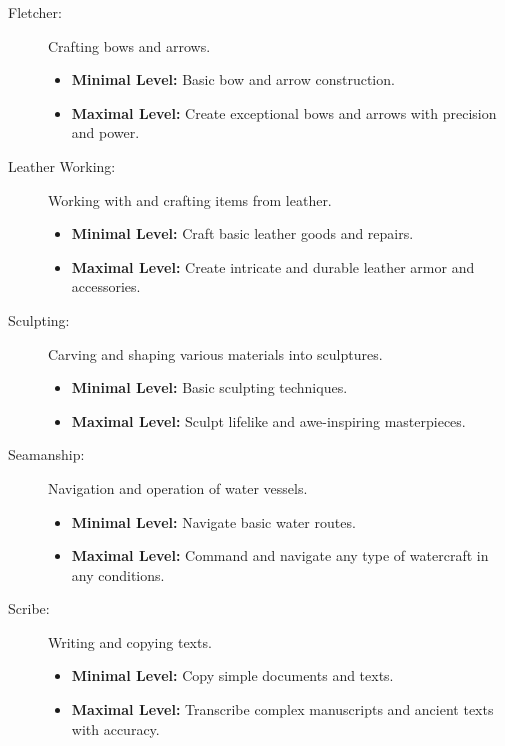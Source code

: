 \begin{description}
    \item[Fletcher:] Crafting bows and arrows.
        \begin{itemize}
            \item \textbf{Minimal Level:} Basic bow and arrow construction.
            \item \textbf{Maximal Level:} Create exceptional bows and arrows with precision and power.
        \end{itemize}

    \item[Leather Working:] Working with and crafting items from leather.
        \begin{itemize}
            \item \textbf{Minimal Level:} Craft basic leather goods and repairs.
            \item \textbf{Maximal Level:} Create intricate and durable leather armor and accessories.
        \end{itemize}

    \item[Sculpting:] Carving and shaping various materials into sculptures.
        \begin{itemize}
            \item \textbf{Minimal Level:} Basic sculpting techniques.
            \item \textbf{Maximal Level:} Sculpt lifelike and awe-inspiring masterpieces.
        \end{itemize}

    \item[Seamanship:] Navigation and operation of water vessels.
        \begin{itemize}
            \item \textbf{Minimal Level:} Navigate basic water routes.
            \item \textbf{Maximal Level:} Command and navigate any type of watercraft in any conditions.
        \end{itemize}

    \item[Scribe:] Writing and copying texts.
        \begin{itemize}
            \item \textbf{Minimal Level:} Copy simple documents and texts.
            \item \textbf{Maximal Level:} Transcribe complex manuscripts and ancient texts with accuracy.
        \end{itemize}


\end{description}
